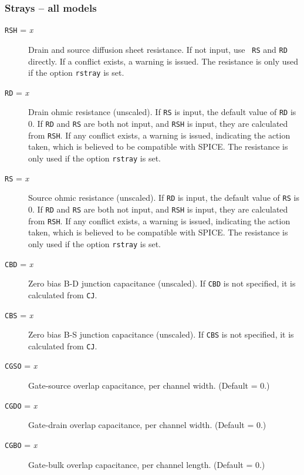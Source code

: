 \subsubsection{Strays -- all models}
\begin{description}

\item[{\tt RSH} = {\it x}]
Drain and source diffusion sheet resistance.  If not input, use {\tt
RS} and {\tt RD} directly.  If a conflict exists, a warning is issued.
The resistance is only used if the option {\tt rstray} is set.

\item[{\tt RD} = {\it x}]
Drain ohmic resistance (unscaled).  If {\tt RS} is input, the default
value of {\tt RD} is 0.  If {\tt RD} and {\tt RS} are both not input,
and {\tt RSH} is input, they are calculated from {\tt RSH}.  If any
conflict exists, a warning is issued, indicating the action taken,
which is believed to be compatible with SPICE.  The resistance is only
used if the option {\tt rstray} is set.

\item[{\tt RS} = {\it x}]
Source ohmic resistance (unscaled).  If {\tt RD} is input, the default
value of {\tt RS} is 0.  If {\tt RD} and {\tt RS} are both not input,
and {\tt RSH} is input, they are calculated from {\tt RSH}.  If any
conflict exists, a warning is issued, indicating the action taken,
which is believed to be compatible with SPICE.  The resistance is only
used if the option {\tt rstray} is set.

\item[{\tt CBD} = {\it x}]
Zero bias B-D junction capacitance (unscaled).  If {\tt CBD} is not
specified, it is calculated from {\tt CJ}.

\item[{\tt CBS} = {\it x}]
Zero bias B-S junction capacitance (unscaled).  If {\tt CBS} is not
specified, it is calculated from {\tt CJ}.

\item[{\tt CGSO} = {\it x}]
Gate-source overlap capacitance, per channel width. (Default = 0.)

\item[{\tt CGDO} = {\it x}]
Gate-drain overlap capacitance, per channel width. (Default = 0.)

\item[{\tt CGBO} = {\it x}]
Gate-bulk overlap capacitance, per channel length. (Default = 0.)

\end{description}
